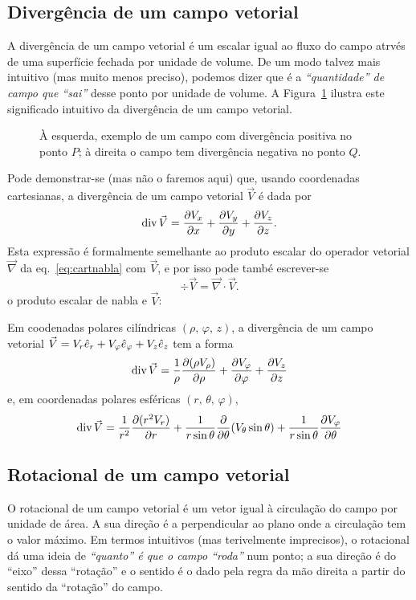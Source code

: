 \subsection*{Divergência de um campo vetorial}
A divergência de um campo vetorial é um escalar igual ao fluxo do campo atrvés
de uma superfície fechada por unidade de volume.  De um modo talvez mais
intuitivo (mas muito menos preciso), podemos dizer que é a \emph{``quantidade''
de campo que ``sai''} desse ponto por unidade de volume. A
Figura~\ref{fig:10-020} ilustra este significado intuitivo da divergência de um
campo vetorial.
\begin{figure}[htb]
  {\centering
    \par
  }
  \caption{À esquerda, exemplo de um campo com divergência positiva no ponto
  $P$; à direita o campo tem divergência negativa no ponto
  $Q$.\label{fig:10-020}}
\end{figure}


Pode demonstrar-se (mas não o faremos aqui) que, usando coordenadas cartesianas,
a divergência de um campo vetorial $\vec V$ é dada por
\begin{equation}\label{eq:divcart}
  \div\vec V=\pd{V_x}{x} + \pd{V_y}{y}+\pd{V_z}{z}.
\end{equation}
Esta expressão é formalmente semelhante ao produto escalar do operador vetorial
$\vec\nabla$ da eq.~\eqref{eq:cartnabla} com $\vec V$, e por isso pode també
escrever-se
\begin{equation}
  \div\vec V=\vec\nabla\cdot\vec V.
\end{equation}
o produto escalar de nabla e $\vec V$:

Em coodenadas polares cilíndricas $(\rho,\,\varphi,\,z)$, a divergência de um campo
vetorial $\vec V=V_r\he_r+V_\varphi\he_\varphi+V_z\he_z$ tem a forma
\begin{equation}
\div\vec V=\frac{1}{\rho}\pd{(\rho V_\rho)}{\rho}
    +\pd{V_\varphi}{\varphi}+\pd{V_z}{z}
\end{equation}
e, em coordenadas polares esféricas $(r,\,\theta,\,\varphi)$, 
\begin{equation}
\div \vec V=\frac{1}{r^2}\pd{(r^2V_r)}{r}+
    \frac{1}{r\sin\theta}\pd{}{\theta}(V_\theta\sin\theta)+
    \frac{1}{r\sin\theta}\pd{V_\varphi}{\theta}
\end{equation}

\subsection*{Rotacional de um campo vetorial}
O rotacional de um campo vetorial é um vetor igual à circulação do campo por
unidade de área. A sua direção é a perpendicular ao plano onde a circulação tem
o valor máximo. Em termos intuitivos (mas terivelmente imprecisos), o rotacional
dá uma ideia de \emph{``quanto'' é que o campo ``roda''} num ponto; a sua
direção é do ``eixo'' dessa ``rotação'' e o sentido é o dado pela regra da mão
direita a partir do sentido da ``rotação'' do campo. 


